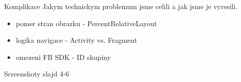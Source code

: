 \documentclass[pdf]{beamer}
\begin{document}
\begin{frame}{Komplikace}
 Jakym technickym problemum jsme celili a jak jsme je vyresili.
 \begin{itemize}
   \item pomer stran obrazku - PercentRelativeLayout
   \item logika navigace - Activity vs. Fragment
   \item omezeni FB SDK - ID skupiny
 \end{itemize}
\end{frame}

\begin{frame}{Screenshoty}
 slajd 4-6
\end{frame}
\end{document}
